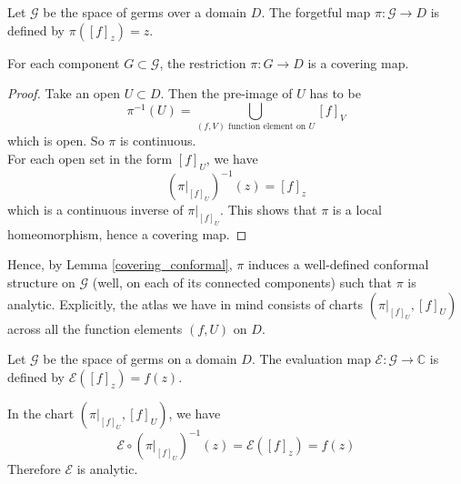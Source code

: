 \begin{definition}
    Let $\mathcal G$ be the space of germs over a domain $D$.
    The forgetful map $\pi:\mathcal G\to D$ is defined by $\pi([f]_z)=z$.
\end{definition}
\begin{lemma}
    For each component $G\subset\mathcal G$, the restriction $\pi:G\to D$ is a covering map.
\end{lemma}
\begin{proof}
    Take an open $U\subset D$.
    Then the pre-image of $U$ has to be
    $$\pi^{-1}(U)=\bigcup_{(f,V)\text{ function element on }U}[f]_V$$
    which is open.
    So $\pi$ is continuous.\\
    For each open set in the form $[f]_U$, we have
    $$(\pi|_{[f]_U})^{-1}(z)=[f]_z$$
    which is a continuous inverse of $\pi|_{[f]_U}$.
    This shows that $\pi$ is a local homeomorphism, hence a covering map.
\end{proof}
Hence, by Lemma \ref{covering_conformal}, $\pi$ induces a well-defined conformal structure on $\mathcal G$ (well, on each of its connected components) such that $\pi$ is analytic.
Explicitly, the atlas we have in mind consists of charts $(\pi|_{[f]_U},[f]_U)$ across all the function elements $(f,U)$ on $D$.
\begin{definition}
    Let $\mathcal G$ be the space of germs on a domain $D$.
    The evaluation map $\mathcal E:\mathcal G\to\mathbb C$ is defined by $\mathcal E([f]_z)=f(z)$.
\end{definition}
In the chart $(\pi|_{[f]_U},[f]_U)$, we have
$$\mathcal E\circ(\pi|_{[f]_U})^{-1}(z)=\mathcal E([f]_z)=f(z)$$
Therefore $\mathcal E$ is analytic.